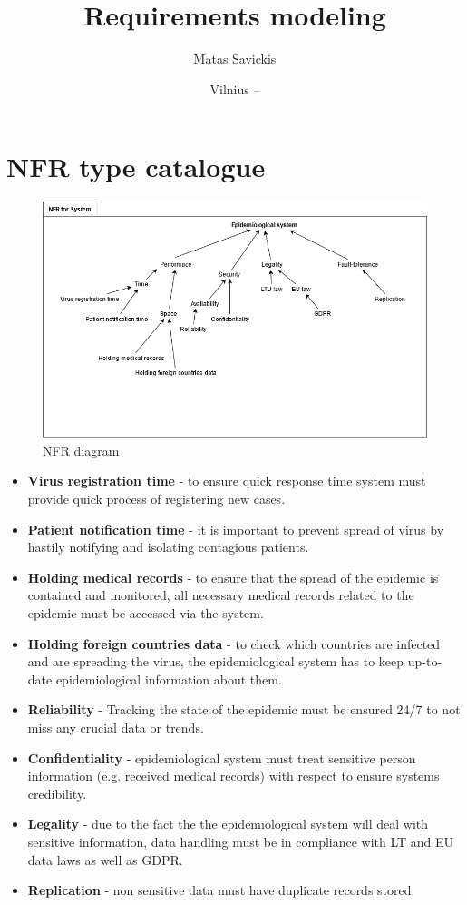 \documentclass{VUMIFPSkursinis}
\title{Requirements modeling}
\author{Matas Savickis}
\date{Vilnius – \the\year}
\begin{document}
\maketitle

\tableofcontents

\section{NFR type catalogue}

\begin{figure}[htbp]
	\includegraphics[scale=0.6]{img/1}
	\caption{NFR diagram} %
	\label{img:kurimoProcesas}
\end{figure}

	\begin{itemize}
		\item{\textbf{Virus registration time} - to ensure quick response time system must provide quick process of registering new cases. }
		\item{\textbf{Patient notification time} - it is important to prevent spread of virus by hastily notifying and isolating contagious patients.}
		\item{\textbf{Holding medical records} - to ensure that the spread of the epidemic is contained and monitored, all necessary medical records related to the epidemic must be accessed via the system. }
		\item{\textbf{Holding foreign countries data} - to check which countries are infected and are spreading the virus, the epidemiological system has to keep up-to-date epidemiological information about them.}
		\item{\textbf{Reliability} - Tracking the state of the epidemic must be ensured 24/7 to not miss any crucial data or trends.}
		\item{\textbf{Confidentiality} - epidemiological system must treat sensitive person information (e.g. received medical records) with respect to ensure systems credibility.}
		\item {\textbf{Legality} - due to the fact the the epidemiological system will deal with sensitive information, data handling must be in compliance with LT and EU data laws as well as GDPR.}
		\item{\textbf{Replication} - non sensitive data must have duplicate records stored.}
	\end{itemize}
\end{document}
